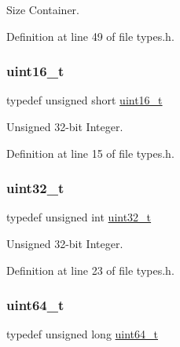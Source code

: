 Size Container. 



Definition at line 49 of file types.\+h.

\mbox{\label{a00104_a273cf69d639a59973b6019625df33e30_a273cf69d639a59973b6019625df33e30}} 
\subsubsection{\texorpdfstring{uint16\+\_\+t}{uint16\_t}}
{\footnotesize\ttfamily typedef unsigned short \hyperlink{a00104_a273cf69d639a59973b6019625df33e30_a273cf69d639a59973b6019625df33e30}{uint16\+\_\+t}}



Unsigned 32-\/bit Integer. 



Definition at line 15 of file types.\+h.

\mbox{\label{a00104_a435d1572bf3f880d55459d9805097f62_a435d1572bf3f880d55459d9805097f62}} 
\subsubsection{\texorpdfstring{uint32\+\_\+t}{uint32\_t}}
{\footnotesize\ttfamily typedef unsigned int \hyperlink{a00104_a435d1572bf3f880d55459d9805097f62_a435d1572bf3f880d55459d9805097f62}{uint32\+\_\+t}}



Unsigned 32-\/bit Integer. 



Definition at line 23 of file types.\+h.

\mbox{\label{a00104_aa232ecf786a74ce5363c36c10798d2b1_aa232ecf786a74ce5363c36c10798d2b1}} 
\subsubsection{\texorpdfstring{uint64\+\_\+t}{uint64\_t}}
{\footnotesize\ttfamily typedef unsigned long \hyperlink{a00104_aa232ecf786a74ce5363c36c10798d2b1_aa232ecf786a74ce5363c36c10798d2b1}{uint64\+\_\+t}}



